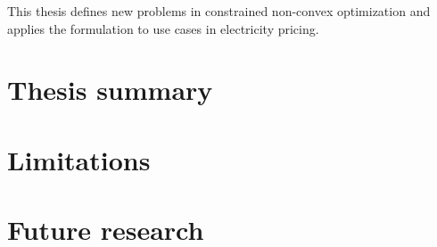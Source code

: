 
\label{chap:Conclusion}

This thesis defines new problems in constrained non-convex optimization
and applies the formulation to use cases in electricity pricing.

\section{Thesis summary}

\section{Limitations}\label{sec:Limitations}

\section{Future research}\label{sec:Future}
